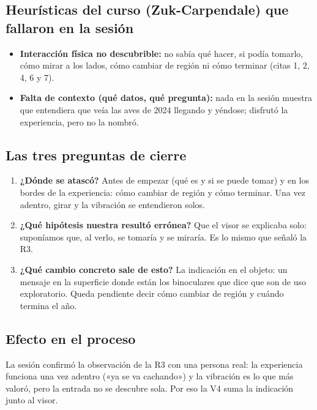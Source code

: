 \documentclass[11pt,a4paper]{article}
\begin{document}
\subsection*{Heurísticas del curso (Zuk-Carpendale) que fallaron en la sesión}
\begin{itemize}
\item \textbf{Interacción física no descubrible:} no sabía qué hacer, si podía tomarlo, cómo mirar a los lados, cómo cambiar de región ni cómo terminar (citas 1, 2, 4, 6 y 7).
\item \textbf{Falta de contexto (qué datos, qué pregunta):} nada en la sesión muestra que entendiera que veía las aves de 2024 llegando y yéndose; disfrutó la experiencia, pero no la nombró.
\end{itemize}
\subsection*{Las tres preguntas de cierre}
\begin{enumerate}
\item \textbf{¿Dónde se atascó?} Antes de empezar (qué es y si se puede tomar) y en los bordes de la experiencia: cómo cambiar de región y cómo terminar. Una vez adentro, girar y la vibración se entendieron solos.
\item \textbf{¿Qué hipótesis nuestra resultó errónea?} Que el visor se explicaba solo: suponíamos que, al verlo, se tomaría y se miraría. Es lo mismo que señaló la R3.
\item \textbf{¿Qué cambio concreto sale de esto?} La indicación en el objeto: un mensaje en la superficie donde están los binoculares que dice que son de uso exploratorio. Queda pendiente decir cómo cambiar de región y cuándo termina el año.
\end{enumerate}
\subsection*{Efecto en el proceso}
La sesión confirmó la observación de la R3 con una persona real: la experiencia funciona una vez adentro («ya se va cachando») y la vibración es lo que más valoró, pero la entrada no se descubre sola. Por eso la V4 suma la indicación junto al visor.
\end{document}
